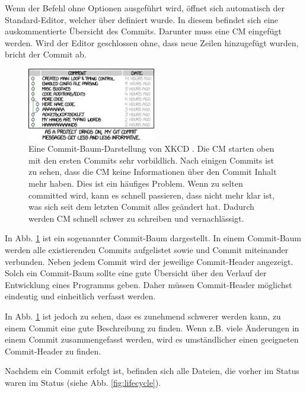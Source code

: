 Wenn der Befehl  ohne Optionen ausgeführt wird, öffnet sich automatisch der Standard-Editor, welcher über  definiert wurde. In diesem befindet sich eine auskommentierte Übersicht des Commits. Darunter muss eine CM eingefügt werden. Wird der Editor geschlossen ohne, dass neue Zeilen hinzugefügt wurden, bricht der Commit ab.
\begin{figure}[!h]
        \centering
        \includegraphics[width=0.5\textwidth]{Bilder/git_commit.png}
        \caption{Eine Commit-Baum-Darstellung von XKCD \cite{Munroe}. Die CM starten oben mit den ersten Commits sehr vorbildlich. Nach einigen Commits ist zu sehen, dass die CM keine Informationen über den Commit Inhalt mehr haben. Dies ist ein häufiges Problem. Wenn zu selten committed wird, kann es schnell passieren, dass nicht mehr klar ist, was sich seit dem letzten Commit alles geändert hat. Dadurch werden CM schnell schwer zu schreiben und vernachlässigt.}
        \label{fig:Commit-XKCD}
\end{figure}

In Abb. \ref{fig:Commit-XKCD} ist ein sogenannter Commit-Baum dargestellt. In einem Commit-Baum werden alle existierenden Commits aufgelistet sowie  und  Commit miteinander verbunden. Neben jedem Commit wird der jeweilige Commit-Header angezeigt. Solch ein Commit-Baum sollte eine gute Übersicht über den Verlauf der Entwicklung eines Programms geben. Daher müssen Commit-Header möglichst eindeutig und einheitlich verfasst werden.

In Abb. \ref{fig:Commit-XKCD} ist jedoch zu sehen, dass es zunehmend schwerer werden kann, zu einem Commit eine gute Beschreibung zu finden. Wenn z.B. viele Änderungen in einem Commit zusammengefasst werden, wird es umständlicher einen geeigneten Commit-Header zu finden.

Nachdem ein Commit erfolgt ist, befinden sich alle Dateien, die vorher im  Status waren im  Status (siehe Abb. \ref{fig:lifecycle}). 
%
